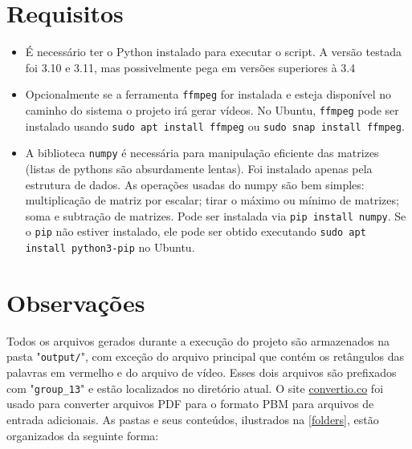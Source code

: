 \documentclass[english, 
               brazil, 
               bsc] %
               {dcomp-abntex2}
\begin{document}
\section{Requisitos} \label{sec-req}
\begin{itemize}
  \item É necessário ter o Python instalado para executar o script. A versão testada foi 3.10 e 3.11, mas possivelmente pega em versões superiores à 3.4
  \item Opcionalmente se a ferramenta \texttt{ffmpeg} for instalada e esteja disponível no caminho do sistema o projeto irá gerar vídeos. No Ubuntu, \texttt{ffmpeg} pode ser instalado usando \texttt{sudo apt install ffmpeg} ou \texttt{sudo snap install ffmpeg}.
  \item A biblioteca \texttt{numpy} é necessária para manipulação eficiente das matrizes (listas de pythons são absurdamente lentas). Foi instalado apenas pela estrutura de dados. As operações usadas do numpy são bem simples:  multiplicação de matriz por escalar; tirar o máximo ou mínimo de matrizes; soma e subtração de matrizes. Pode ser instalada via \texttt{pip install numpy}. Se o \texttt{pip} não estiver instalado, ele pode ser obtido executando \texttt{sudo apt install python3-pip} no Ubuntu. \end{itemize}


\section{Observações}




Todos os arquivos gerados durante a execução do projeto são armazenados na pasta "\texttt{output/}", com exceção do arquivo principal que contém os retângulos das palavras em vermelho e do arquivo de vídeo. Esses dois arquivos são prefixados com "\texttt{group\_13}" e estão localizados no diretório atual.
O site \href{https://convertio.co/pdf-pbm/}{convertio.co} foi usado para converter arquivos PDF para o formato PBM para arquivos de entrada adicionais. As pastas e seus conteúdos, ilustrados na \autoref{folders}, estão organizados da seguinte forma:
\end{document}
